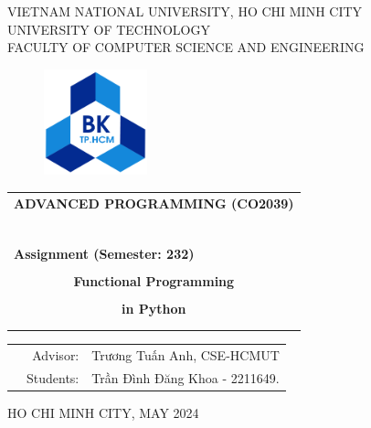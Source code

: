 \documentclass[a4paper]{article}
\begin{document}
\begin{titlepage}
\begin{center}
VIETNAM NATIONAL UNIVERSITY, HO CHI MINH CITY \\
UNIVERSITY OF TECHNOLOGY \\
FACULTY OF COMPUTER SCIENCE AND ENGINEERING
\end{center}

\vspace{1cm}

\begin{figure}[h!]
\begin{center}
\includegraphics[width=3cm]{hcmut.png}
\end{center}
\end{figure}

\vspace{1cm}


\begin{center}
\begin{tabular}{c}
\multicolumn{1}{l}{\textbf{{\Large ADVANCED PROGRAMMING (CO2039)}}}\\
~~\\
\hline
\\
\multicolumn{1}{l}{\textbf{{Assignment (Semester: 232)}}}\\
\\
\textbf{{\Huge Functional Programming}}\\
\\
\textbf{{\Huge in Python}}\\[10pt]

\multicolumn{1}{l}{}\\
\\
\hline
\end{tabular}
\end{center}
\vspace{2cm}

\begin{table}[h]
	\begin{tabular}{rrl}
		\hspace{5 cm} & Advisor: & Trương Tuấn Anh, CSE-HCMUT\\[6pt]
		& Students: & Trần Đình Đăng Khoa \hspace*{0.05cm} - 2211649. \\
	\end{tabular}
\end{table}

\vspace*{1cm}

\begin{center}
{\footnotesize HO CHI MINH CITY, MAY 2024}
\end{center}
\end{titlepage}
\end{document}
